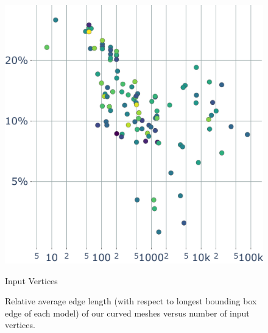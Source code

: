 \begin{figure}
    \parbox{.3\linewidth}{\includegraphics[width=\linewidth]{curve_meshing_in_shell_tex/figs/stats/edgelength_PolyCube}}\par
    \scriptsize{Input Vertices}
    \caption{Relative average edge length (with respect to longest bounding box edge of each model) of our curved meshes versus number of input vertices.}
    \label{bichon:fig:tet-count}
\end{figure}


